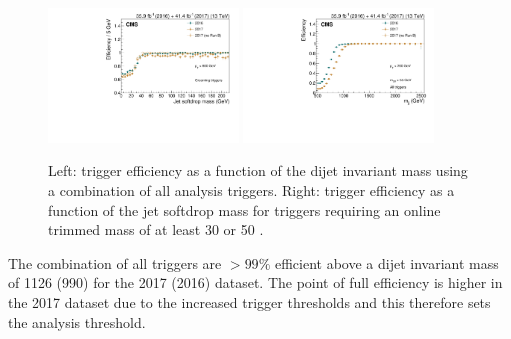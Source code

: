 \begin{figure}[h!]
\centering 
\includegraphics[width=0.45\textwidth]{figures/analysis/search3/B2G-18-002/Combined_mj1_16vs17.pdf}
\includegraphics[width=0.45\textwidth]{figures/analysis/search3/B2G-18-002/Combined_mjj_16vs17.pdf}
\caption{Left: trigger efficiency as a function of the dijet invariant mass using a combination of all analysis triggers. Right: trigger efficiency as a function of the jet softdrop mass for triggers requiring an online trimmed mass of at least 30 or 50 \GeV.}
\label{fig:trigturnon}
\end{figure}
The combination of all triggers are $>99\%$ efficient above a dijet invariant mass of 1126 (990) \GeV for the 2017 (2016) dataset. The point of full efficiency is higher in the 2017 dataset due to the increased trigger thresholds and this therefore sets the analysis threshold. 

